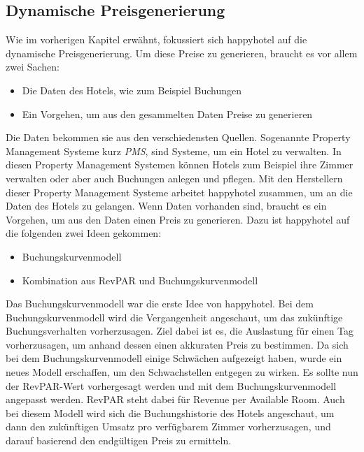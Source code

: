 \subsection{Dynamische Preisgenerierung}
\label{subsec:Preisgenerierung}
Wie im vorherigen Kapitel erwähnt, fokussiert sich happyhotel auf die dynamische Preisgenerierung. Um diese Preise zu generieren, braucht es vor allem zwei Sachen:
\begin{itemize}
    \item Die Daten des Hotels, wie zum Beispiel Buchungen
    \item Ein Vorgehen, um aus den gesammelten Daten Preise zu generieren
\end{itemize}

Die Daten bekommen sie aus den verschiedensten Quellen. Sogenannte Property Management Systeme kurz \emph{PMS}, sind Systeme, um ein Hotel zu verwalten. In diesen Property Management Systemen können Hotels zum Beispiel ihre Zimmer verwalten oder aber auch Buchungen anlegen und pflegen. Mit den Herstellern dieser Property Management Systeme arbeitet happyhotel zusammen, um an die Daten des Hotels zu gelangen. 
\newline
Wenn Daten vorhanden sind, braucht es ein Vorgehen, um aus den Daten einen Preis zu generieren. Dazu ist happyhotel auf die folgenden zwei Ideen gekommen:
\begin{itemize}
    \item Buchungskurvenmodell
    \item Kombination aus RevPAR und Buchungskurvenmodell
\end{itemize}

Das Buchungskurvenmodell war die erste Idee von happyhotel. Bei dem Buchungskurvenmodell wird die Vergangenheit angeschaut, um das zukünftige Buchungsverhalten vorherzusagen. Ziel dabei ist es, die Auslastung für einen Tag vorherzusagen, um anhand dessen einen akkuraten Preis zu bestimmen. 
\newline
\newline
Da sich bei dem Buchungskurvenmodell einige Schwächen aufgezeigt haben, wurde ein neues Modell erschaffen, um den Schwachstellen entgegen zu wirken. Es sollte nun der RevPAR-Wert vorhergesagt werden und mit dem Buchungskurvenmodell angepasst werden. RevPAR steht dabei für Revenue per Available Room. Auch bei diesem Modell wird sich die Buchungshistorie des Hotels angeschaut, um dann den zukünftigen Umsatz pro verfügbarem Zimmer vorherzusagen, und darauf basierend den endgültigen Preis zu ermitteln.